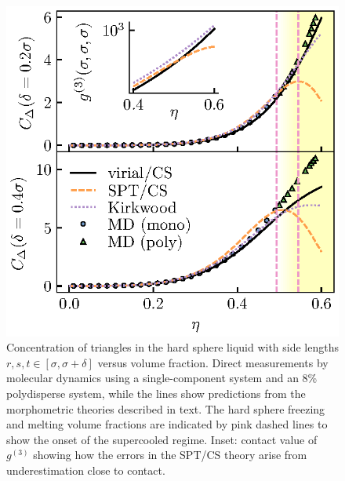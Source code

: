 \documentclass[11pt,twoside]{report}
\begin{document}
\begin{figure}
  \includegraphics[width=0.9\linewidth,outer]{sp3}
  \caption[Number of triangles in the bulk liquid]{
    Concentration of triangles in the hard sphere liquid with side lengths $r,s,t \in [\sigma, \sigma + \delta]$ versus volume fraction.
    Direct measurements by molecular dynamics using a single-component system and an 8\% polydisperse system, while the lines show predictions from the morphometric theories described in text.
    The hard sphere freezing and melting volume fractions are indicated by pink dashed lines to show the onset of the supercooled regime.
    Inset: contact value of $g^{(3)}$ showing how the errors in the SPT/CS theory arise from underestimation close to contact.}
  \label{fig:sp3}
\end{figure}
\end{document}
